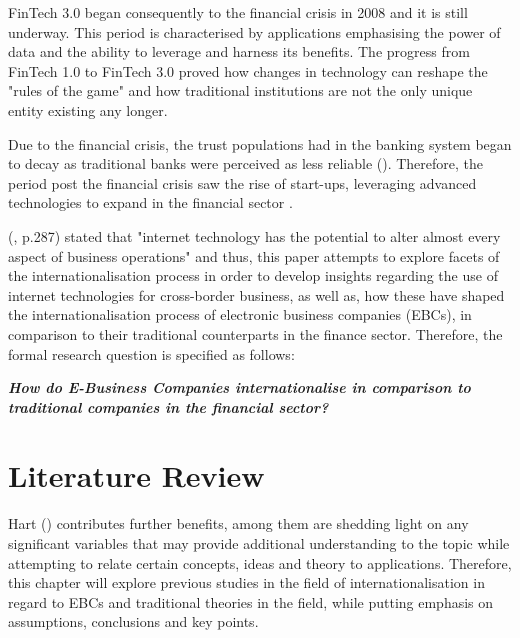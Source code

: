 \documentclass[11pt,a4paper]{article}
\begin{document}
FinTech 3.0 began consequently to the financial crisis in 2008 and it is still underway. This period is characterised by applications emphasising the power of data and the ability to leverage and harness its benefits. The progress from FinTech 1.0 to FinTech 3.0 proved how changes in technology can reshape the "rules of the game" and how traditional institutions are not the only unique entity existing any longer. \par
Due to the financial crisis, the trust populations had in the banking system began to decay as traditional banks were perceived as less reliable (\cite{andrewConfidenceBanksLow2015}). Therefore, the period post the financial crisis saw the rise of start-ups, leveraging advanced technologies to expand in the financial sector \parencite{arner150YearsFintech2016}.  \par
\citeauthor{parasuramanMarketingServingCustomers2002} (\citeyear{parasuramanMarketingServingCustomers2002}, p.287) stated that "internet technology has the potential to alter almost every aspect of business operations"  and thus, this paper attempts to explore facets of the internationalisation process in order to  develop insights regarding the use of internet technologies for cross-border business, as well as, how these have shaped the internationalisation process of electronic business companies (EBCs), in comparison to their traditional counterparts in the finance sector.  Therefore, the formal research question is specified as follows:

\begin{center}
\textbf{\textit{How do E-Business Companies internationalise in comparison to traditional companies in the financial sector?}}
\end{center}
 
\newpage

\section{Literature Review}
\label{lit_review}
  \vspace{-1mm}
\par 
Hart (\citeyear{hartDoingLiteratureReview1998}) contributes further benefits, among them are shedding light on any significant variables that may provide additional understanding to the topic while attempting to relate certain concepts, ideas and theory to applications. Therefore, this chapter will explore previous studies in the field of internationalisation in regard to EBCs and traditional theories in the field, while putting emphasis on assumptions, conclusions and key points.
\end{document}

